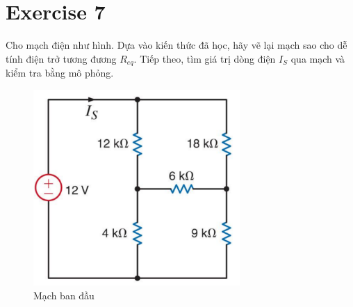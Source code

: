 \section{Exercise 7}
Cho mạch điện như hình. Dựa vào kiến thức đã học, hãy vẽ lại mạch sao cho dễ tính điện trở tương đương \(R_{eq}\). Tiếp theo, tìm giá trị dòng điện \(I_S\) qua mạch và kiểm tra bằng mô phỏng.
\begin{figure}[!htbp]
    \centering
    \includegraphics[width=0.7\textwidth]{graphics/ex7/f1.png}
    \caption{Mạch ban đầu}
\end{figure}
